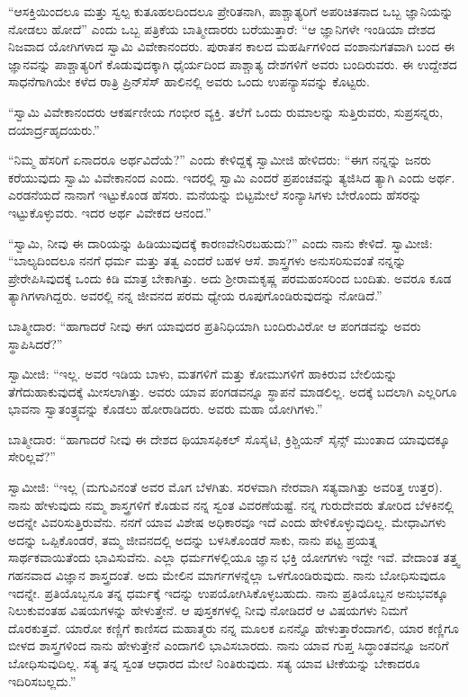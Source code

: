  “ಆಸಕ್ತಿಯಿಂದಲೂ ಮತ್ತು ಸ್ವಲ್ಪ ಕುತೂಹಲದಿಂದಲೂ ಪ್ರೇರಿತನಾಗಿ, ಪಾಶ್ಚಾತ್ಯರಿಗೆ ಅಪರಿಚಿತನಾದ ಒಬ್ಬ ಜ್ಞಾನಿಯನ್ನು ನೋಡಲು ಹೋದೆ” ಎಂದು ಒಬ್ಬ ಪತ್ರಿಕೆಯ ಬಾತ್ಮೀದಾರರು ಬರೆಯುತ್ತಾರೆ: “ಆ ಜ್ಞಾನಿಗಳೇ ಇಂಡಿಯಾ ದೇಶದ ನಿಜವಾದ ಯೋಗಿಗಳಾದ ಸ್ವಾಮಿ ವಿವೇಕಾನಂದರು. ಪುರಾತನ ಕಾಲದ ಮಹರ್ಷಿಗಳಿಂದ ವಂಶಾನುಗತವಾಗಿ ಬಂದ ಈ ಜ್ಞಾನವನ್ನು ಪಾಶ್ಚಾತ್ಯರಿಗೆ ಕೊಡುವುದಕ್ಕಾಗಿ ಧೈರ್ಯದಿಂದ ಪಾಶ್ಚಾತ್ಯ ದೇಶಗಳಿಗೆ ಅವರು ಬಂದಿರುವರು. ಈ ಉದ್ದೇಶದ ಸಾಧನೆಗಾಗಿಯೇ ಕಳೆದ ರಾತ್ರಿ ಪ್ರಿನ್‍ಸೆಸ್ ಹಾಲಿನಲ್ಲಿ ಅವರು ಒಂದು ಉಪನ್ಯಾಸವನ್ನು ಕೊಟ್ಟರು. 

 “ಸ್ವಾಮಿ ವಿವೇಕಾನಂದರು ಆಕರ್ಷಣೀಯ ಗಂಭೀರ ವ್ಯಕ್ತಿ. ತಲೆಗೆ ಒಂದು ರುಮಾಲನ್ನು ಸುತ್ತಿರುವರು, ಸುಪ್ರಸನ್ನರು, ದಯಾರ್ದ್ರಹೃದಯರು.” 

 “ನಿಮ್ಮ ಹೆಸರಿಗೆ ಏನಾದರೂ ಅರ್ಥವಿದೆಯೆ?” ಎಂದು ಕೇಳಿದ್ದಕ್ಕೆ ಸ್ವಾಮೀಜಿ ಹೇಳಿದರು: “ಈಗ ನನ್ನನ್ನು ಜನರು ಕರೆಯುವುದು ಸ್ವಾಮಿ ವಿವೇಕಾನಂದ ಎಂದು. ಇದರಲ್ಲಿ ಸ್ವಾಮಿ ಎಂದರೆ ಪ್ರಪಂಚವನ್ನು ತ್ಯಜಿಸಿದ ತ್ಯಾಗಿ ಎಂದು ಅರ್ಥ. ಎರಡನೆಯದೆ ನಾನಾಗೆ ಇಟ್ಟುಕೊಂಡ ಹೆಸರು. ಮನೆಯನ್ನು ಬಿಟ್ಟಮೇಲೆ ಸಂನ್ಯಾಸಿಗಳು ಬೇರೊಂದು ಹೆಸರನ್ನು ಇಟ್ಟುಕೊಳ್ಳುವರು. ಇದರ ಅರ್ಥ ವಿವೇಕದ ಆನಂದ.” 

 “ಸ್ವಾಮಿ, ನೀವು ಈ ದಾರಿಯನ್ನು ಹಿಡಿಯುವುದಕ್ಕೆ ಕಾರಣವೇನಿರಬಹುದು?” ಎಂದು ನಾನು ಕೇಳಿದೆ. ಸ್ವಾಮೀಜಿ: “ಬಾಲ್ಯದಿಂದಲೂ ನನಗೆ ಧರ್ಮ ಮತ್ತು ತತ್ವ ಎಂದರೆ ಬಹಳ ಆಸೆ. ಶಾಸ್ತ್ರಗಳು ಅನುಸರಿಸುವಂತೆ ನನ್ನನ್ನು ಪ್ರೇರೇಪಿಸಿವುದಕ್ಕೆ ಒಂದು ಕಿಡಿ ಮಾತ್ರ ಬೇಕಾಗಿತ್ತು. ಅದು ಶ‍್ರೀರಾಮಕೃಷ್ಣ ಪರಮಹಂಸರಿಂದ ಬಂದಿತು. ಅವರೂ ಕೂಡ ತ್ಯಾಗಿಗಳಾಗಿದ್ದರು. ಅವರಲ್ಲಿ ನನ್ನ ಜೀವನದ ಪರಮ ಧ್ಯೇಯ ರೂಪುಗೊಂಡಿರುವುದನ್ನು ನೋಡಿದೆ.” 

 ಬಾತ್ಮೀದಾರ: “ಹಾಗಾದರೆ ನೀವು ಈಗ ಯಾವುದರ ಪ್ರತಿನಿಧಿಯಾಗಿ ಬಂದಿರುವಿರೋ ಆ ಪಂಗಡವನ್ನು ಅವರು ಸ್ಥಾಪಿಸಿದರೆ?” 

 ಸ್ವಾಮೀಜಿ: “ಇಲ್ಲ. ಅವರ ಇಡಿಯ ಬಾಳು, ಮತಗಳಿಗೆ ಮತ್ತು ಕೋಮುಗಳಿಗೆ ಹಾಕಿರುವ ಬೇಲಿಯನ್ನು ತೆಗೆದುಹಾಕುವುದಕ್ಕೆ ಮೀಸಲಾಗಿತ್ತು. ಅವರು ಯಾವ ಪಂಗಡವನ್ನೂ ಸ್ಥಾಪನೆ ಮಾಡಲಿಲ್ಲ. ಅದಕ್ಕೆ ಬದಲಾಗಿ ಎಲ್ಲರಿಗೂ ಭಾವನಾ ಸ್ವಾತಂತ್ರ್ಯವನ್ನು ಕೊಡಲು ಹೋರಾಡಿದರು. ಅವರು ಮಹಾ ಯೋಗಿಗಳು.” 

 ಬಾತ್ಮೀದಾರ: “ಹಾಗಾದರೆ ನೀವು ಈ ದೇಶದ ಥಿಯಾಸಫಿಕಲ್ ಸೊಸೈಟಿ, ಕ್ರಿಶ್ಚಿಯನ್ ಸೈನ್ಸ್ ಮುಂತಾದ ಯಾವುದಕ್ಕೂ ಸೇರಿಲ್ಲವೆ?” 

 ಸ್ವಾಮೀಜಿ: “ಇಲ್ಲ (ಮಗುವಿನಂತೆ ಅವರ ಮೊಗ ಬೆಳಗಿತು. ಸರಳವಾಗಿ ನೇರವಾಗಿ ಸತ್ಯವಾಗಿತ್ತು ಅವರಿತ್ತ ಉತ್ತರ). ನಾನು ಹೇಳುವುದು ನಮ್ಮ ಶಾಸ್ತ್ರಗಳಿಗೆ ಕೊಡುವ ನನ್ನ ಸ್ವಂತ ವಿವರಣೆಯಷ್ಟೆ. ನನ್ನ ಗುರುದೇವರು ತೋರಿದ ಬೆಳಕಿನಲ್ಲಿ ಅದನ್ನೇ ವಿವರಿಸುತ್ತಿರುವೆನು. ನನಗೆ ಯಾವ ವಿಶೇಷ ಅಧಿಕಾರವೂ ಇದೆ ಎಂದು ಹೇಳಿಕೊಳ್ಳುವುದಿಲ್ಲ. ಮೇಧಾವಿಗಳು ಅದನ್ನು ಒಪ್ಪಿಕೊಂಡರೆ, ತಮ್ಮ ಜೀವನದಲ್ಲಿ ಅದನ್ನು ಬಳಸಿಕೊಂಡರೆ ಸಾಕು, ನಾನು ಪಟ್ಟ ಪ್ರಯತ್ನ ಸಾರ್ಥಕವಾಯಿತೆಂದು ಭಾವಿಸುವೆನು. ಎಲ್ಲಾ ಧರ್ಮಗಳಲ್ಲಿಯೂ ಜ್ಞಾನ ಭಕ್ತಿ ಯೋಗಗಳು ಇದ್ದೇ ಇವೆ. ವೇದಾಂತ ತತ್ತ್ವ ಗಹನವಾದ ವಿಜ್ಞಾನ ಶಾಸ್ತ್ರದಂತೆ. ಅದು ಮೇಲಿನ ಮಾರ್ಗಗಳನ್ನೆಲ್ಲಾ ಒಳಗೊಂಡಿರುವುದು. ನಾನು ಬೋಧಿಸುವುದೂ ಇದನ್ನೇ. ಪ್ರತಿಯೊಬ್ಬನೂ ತನ್ನ ಧರ್ಮಕ್ಕೆ ಇದನ್ನು ಉಪಯೋಗಿಸಿಕೊಳ್ಳಬಹುದು. ನಾನು ಪ್ರತಿಯೊಬ್ಬನ ಅನುಭವಕ್ಕೂ ನಿಲುಕುವಂತಹ ವಿಷಯಗಳನ್ನು ಹೇಳುತ್ತೇನೆ. ಆ ಪುಸ್ತಕಗಳಲ್ಲಿ ನೀವು ನೋಡಿದರೆ ಆ ವಿಷಯಗಳು ನಿಮಗೆ ದೊರಕುತ್ತವೆ. ಯಾರೋ ಕಣ್ಣಿಗೆ ಕಾಣಿಸದ ಮಹಾತ್ಮರು ನನ್ನ ಮೂಲಕ ಏನನ್ನೊ ಹೇಳುತ್ತಾರೆಂದಾಗಲಿ, ಯಾರ ಕಣ್ಣಿಗೂ ಬೀಳದ ಶಾಸ್ತ್ರಗಳಿಂದ ನಾನು ಹೇಳುತ್ತೇನೆ ಎಂದಾಗಲಿ ಭಾವಿಸಬಾರದು. ನಾನು ಯಾವ ಗುಪ್ತ ಸಿದ್ಧಾಂತವನ್ನೂ ಜನರಿಗೆ ಬೋಧಿಸುವುದಿಲ್ಲ. ಸತ್ಯ ತನ್ನ ಸ್ವಂತ ಆಧಾರದ ಮೇಲೆ ನಿಂತಿರುವುದು. ಸತ್ಯ ಯಾವ ಟೀಕೆಯನ್ನು ಬೇಕಾದರೂ ಇದಿರಿಸಬಲ್ಲದು.” 

